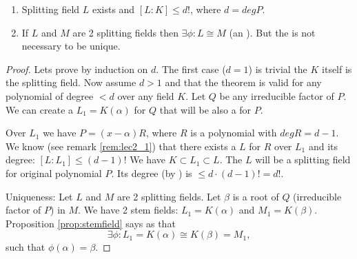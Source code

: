 \begin{theorem}
  \begin{enumerate}
    \item Splitting field $L$ exists and $\left[L:K\right] \le d!$,
      where $d = deg P$.
    \item If $L$ and $M$ are 2 splitting fields then
      $\exists \phi: L \cong M$ (an ). But
      the  is not necessary to be unique.
  \end{enumerate}
  \begin{proof}
    Lets prove by induction on $d$. The first case ($d = 1$) is
    trivial the $K$ itself is the splitting field. Now assume $d > 1$
    and that the theorem is valid for any polynomial of degree $< d$
    over any field $K$. Let $Q$ be any irreducible factor of $P$. We
    can create a  $L_1 = K\left(\alpha\right)$
    for $Q$ that will be also a  for $P$.

    Over $L_1$ we have $P = (x - \alpha) R$, where $R$ is a polynomial
    with $deg R = d - 1$. We know (see remark \ref{rem:lec2_1}) that
    there exists a  $L$ for $R$ over $L_1$
    and its degree:
    \(
    \left[L:L_1\right] \le (d-1)!
    \)
    We have $K \subset L_1 \subset L$. The $L$ will be a splitting
    field for original polynomial $P$. Its degree (by
    ) is $ \le d \cdot (d-1)! = d!$.

    Uniqueness: Let $L$ and $M$ are 2 splitting fields. Let $\beta$ is
    a root of $Q$ (irreducible factor of $P$) in $M$.
    We have 2 stem fields: $L_1 = K\left(\alpha\right)$ and
    $M_1 = K\left(\beta\right)$. Proposition \ref{prop:stemfield} says
    as that
    \[
    \exists \phi: L_1 = K\left(\alpha\right) \cong
    K\left(\beta\right) = M_1, 
    \]
    such that $\phi(\alpha) = \beta$.


\end{proof}
\end{theorem}
